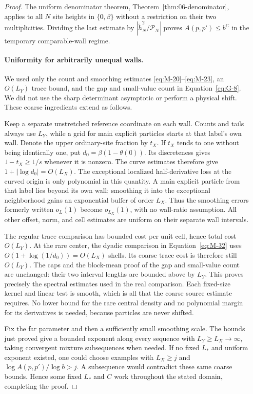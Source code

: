 \begin{proof}
The uniform denominator theorem, Theorem~\ref{thm:06-denominator},
applies to all $N$ site heights in $\{0,\beta\}$ without a
restriction on their two multiplicities.  Dividing the last estimate
by $|\widetilde h_N^2/\mathcal P_N|$ proves $A(p,p')\le b^C$
in the temporary comparable-wall regime.

\paragraph{Uniformity for arbitrarily unequal walls.}
We used only the count and smoothing estimates
\eqref{eq:M-20}--\eqref{eq:M-23}, an $O(L_Y)$ trace bound,
and the gap and small-value count in Equation~\eqref{eq:G-8}.
We did not use the sharp determinant asymptotic or perform a physical
shift.  These coarse ingredients extend as follows.

Keep a separate unstretched reference coordinate on each wall.  Counts
and tails always use $L_Y$, while a grid for main explicit particles
starts at that label's own wall.  Denote the upper ordinary-site
fraction by $t_X$.  If $t_X$ tends to one without being identically
one, put
$d_0=\beta(1-\theta(0))$.  Its discreteness gives
$1-t_X\ge1/s$ whenever it is nonzero.  The curve estimates therefore
give $1+|\log d_0|=O(L_X)$.  The exceptional localized
half-derivative loss at the curved origin is only polynomial in this
quantity.  A main explicit particle from that label lies beyond its
own wall; smoothing it into the exceptional neighborhood gains an
exponential buffer of order $L_X$.  Thus the smoothing errors formerly
written $o_L(1)$ become $o_{L_X}(1)$, with no wall-ratio assumption.
All other offset, norm, and cell estimates are uniform on their separate
wall intervals.

The regular trace comparison has bounded cost per unit cell, hence
total cost $O(L_Y)$.  At the rare center, the dyadic comparison in
Equation~\eqref{eq:M-32} uses
$O(1+\log(1/d_0))=O(L_X)$ shells.  Its coarse trace cost is
therefore still $O(L_Y)$.  The caps and the block-mean proof of the
gap and small-value count are unchanged: their two interval lengths
are bounded above by $L_Y$.  This proves precisely the spectral
estimates used in the real comparison.  Each fixed-size kernel and
linear test is smooth, which is all that the coarse source estimate
requires.  No lower bound for the rare central density and no polynomial
margin for its derivatives is needed, because particles are never
shifted.

Fix the far parameter and then a sufficiently small smoothing scale.
The bounds just proved give a bounded exponent along every sequence
with $L_Y\ge L_X\to\infty$, taking convergent mixture
subsequences when needed.  If no fixed $L_*$ and uniform exponent
existed, one could choose examples with $L_X\ge j$ and
$\log A(p,p')/\log b>j$.  A subsequence would contradict these
same coarse bounds.  Hence some fixed $L_*$ and $C$ work throughout
the stated domain, completing the proof.
\end{proof}
